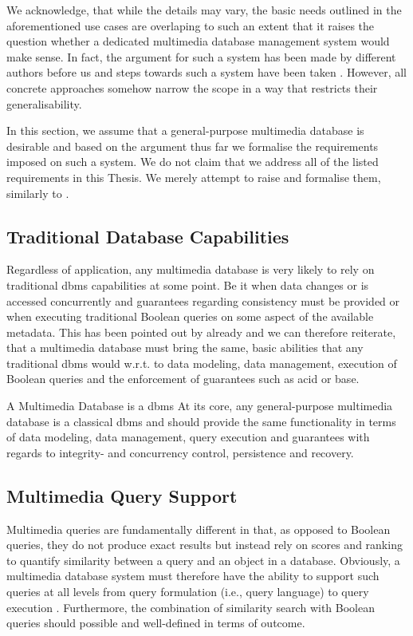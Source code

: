 We acknowledge, that while the details may vary, the basic needs outlined in the aforementioned use cases are overlaping to such an extent that it raises the question whether a dedicated multimedia database management system would make sense. In fact, the argument for such a system has been made by different authors before us \cite{Adjeroh:1997Multimedia,Smeulders:2000Content,Zahalka:2014towards,Jonson:2016,Khaleel:2021An} and steps towards such a system have been taken \cite{Giangreco:2018Database,Wang:2021Milvus}. However, all concrete approaches somehow narrow the scope in a way that restricts their generalisability.

In this section, we assume that a general-purpose multimedia database is desirable and based on the argument thus far we formalise the requirements imposed on such a system. We do not claim that we address all of the listed requirements in this Thesis. We merely attempt to raise and formalise them, similarly to \cite{Adjeroh:1997Multimedia,Jonson:2016,Khaleel:2021An}.

\subsection{Traditional Database Capabilities}
Regardless of application, any multimedia database is very likely to rely on traditional \acrshort{dbms} capabilities at some point. Be it when data changes or is accessed concurrently and guarantees regarding consistency must be provided or when executing traditional Boolean queries on some aspect of the available metadata. This has been pointed out by \cite{Adjeroh:1997Multimedia,Khaleel:2021An} already and we can therefore reiterate, that a multimedia database must bring the same, basic abilities that any traditional \acrshort{dbms} would w.r.t. to data modeling, data management, execution of Boolean queries and the enforcement of guarantees such as \acrshort{acid} or \acrshort{base}.

\begin{requirement}[label=requirement:classical_dbms]{A Multimedia Database is a \acrshort{dbms}}{}
    At its core, any general-purpose multimedia database is a classical \acrlong{dbms} and should provide the same functionality in terms of data modeling, data management, query execution and guarantees with regards to integrity- and concurrency control, persistence and recovery.
\end{requirement}

\subsection{Multimedia Query Support}
Multimedia queries are fundamentally different in that, as opposed to Boolean queries, they do not produce exact results but instead rely on scores and ranking to quantify similarity between a query and an object in a database. Obviously, a multimedia database system must therefore have the ability to support such queries at all levels from query formulation (i.e., query language) to query execution \cite{Adjeroh:1997Multimedia}. Furthermore, the combination of similarity search with Boolean queries should possible and well-defined in terms of outcome.

